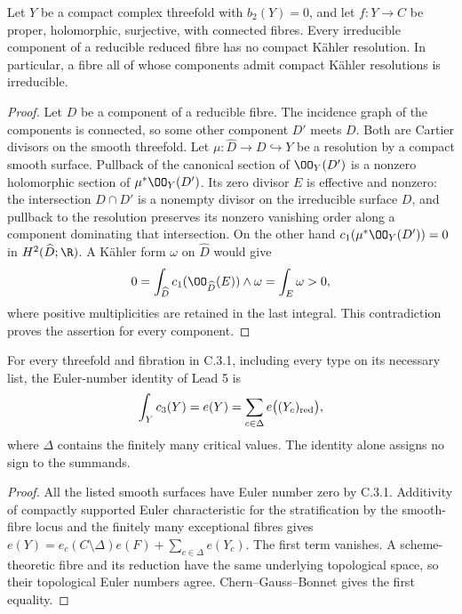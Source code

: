 \begin{proposition}[C.3.4; Proved]\label{st:C.3.4}
Let $Y$ be a compact complex threefold with $b_2(Y)=0$, and let
$f:Y\to C$ be proper, holomorphic, surjective, with connected fibres.
Every irreducible component of a reducible reduced fibre has no
compact K\"ahler resolution. In particular, a fibre all of whose
components admit compact K\"ahler resolutions is irreducible.
\end{proposition}
\begin{proof}
Let $D$ be a component of a reducible fibre. The incidence graph of
the components is connected, so some other component $D'$ meets $D$.
Both are Cartier divisors on the smooth threefold. Let
$\mu:\widehat D\to D\hookrightarrow Y$ be a resolution by a compact
smooth surface. Pullback of the canonical section of $\OO_Y(D')$
is a nonzero holomorphic section of $\mu^*\OO_Y(D')$. Its zero
divisor $E$ is effective and nonzero: the intersection $D\cap D'$
is a nonempty divisor on the irreducible surface $D$, and pullback
to the resolution preserves its nonzero vanishing order along a
component dominating that intersection. On the other hand
$c_1(\mu^*\OO_Y(D'))=0$ in $H^2(\widehat D;\R)$.
A K\"ahler form $\omega$ on $\widehat D$ would give
\[
0=\int_{\widehat D}c_1(\OO_{\widehat D}(E))\wedge\omega
 =\int_E\omega>0,
\]
where positive multiplicities are retained in the last integral.
This contradiction proves the assertion for every component.
\end{proof}

\begin{corollary}[C.3.5; Proved]\label{st:C.3.5}
For every threefold and fibration in C.3.1, including every type on
its necessary list, the Euler-number identity of Lead 5 is
\[
\int_Y c_3(Y)=e(Y)=\sum_{c\in\Delta}e\bigl((Y_c)_{\rm red}\bigr),
\]
where $\Delta$ contains the finitely many critical values.
The identity alone assigns no sign to the summands.
\end{corollary}
\begin{proof}
All the listed smooth surfaces have Euler number zero by C.3.1.
Additivity of compactly supported Euler characteristic for the
stratification by the smooth-fibre locus and the finitely many
exceptional fibres gives
$e(Y)=e_c(C\setminus\Delta)e(F)+\sum_{c\in\Delta}e(Y_c)$.
The first term vanishes. A scheme-theoretic fibre and its reduction
have the same underlying topological space, so their topological
Euler numbers agree. Chern--Gauss--Bonnet gives the first equality.
\end{proof}

